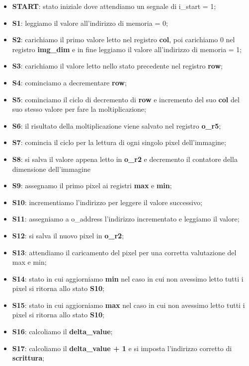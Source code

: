 \documentclass[a4paper, 12pt]{report}
\begin{document}
			\begin{itemize}
 				\item \textbf{START}: stato iniziale dove attendiamo un segnale di i\_start = 1;
				\item \textbf{S1}: leggiamo il valore all'indirizzo di memoria = 0;
                \item \textbf{S2}: carichiamo il primo valore letto nel registro \textbf{col}, poi carichiamo 0 nel registro \textbf{img\_dim} e in fine leggiamo il valore all'indirizzo di memoria = 1;
				\item \textbf{S3}: carichiamo il valore letto nello stato precedente nel registro \textbf{row};
				\item \textbf{S4}: cominciamo a decrementare \textbf{row};
				\item \textbf{S5}: cominciamo il ciclo di decremento di \textbf{row} e incremento del suo \textbf{col} del suo stesso valore per fare la moltiplicazione;
				\item \textbf{S6}: il risultato della moltiplicazione viene salvato nel registro \textbf{o\_r5};
				\item \textbf{S7}: comincia il ciclo per la lettura di ogni singolo pixel dell'immagine;
				\item \textbf{S8}: si salva il valore appena letto in \textbf{o\_r2} e decremento il contatore della dimensione dell'immagine
				\item \textbf{S9}: assegnamo il primo pixel ai registri \textbf{max} e \textbf{min};
				\item \textbf{S10}: incrementiamo l'indirizzo per leggere il valore successivo;
				\item \textbf{S11}: assegniamo a o\_address l'indirizzo incrementato e leggiamo il valore;
				\item \textbf{S12}: si salva il nuovo pixel in \textbf{o\_r2};
				\item \textbf{S13}: attendiamo il caricamento del pixel per una corretta valutazione del max e min;
				\item \textbf{S14}: stato in cui aggiorniamo \textbf{min} nel caso in cui non avessimo letto tutti i pixel si ritorna allo stato \textbf{S10};
				\item \textbf{S15}: stato in cui aggiorniamo \textbf{max} nel caso in cui non avessimo letto tutti i pixel si ritorna allo stato \textbf{S10};
				\item \textbf{S16}: calcoliamo il \textbf{delta\_value};
				\item \textbf{S17}: calcoliamo il \textbf{delta\_value + 1} e si imposta l'indirizzo corretto di \textbf{scrittura};

\end{itemize}
\end{document}
